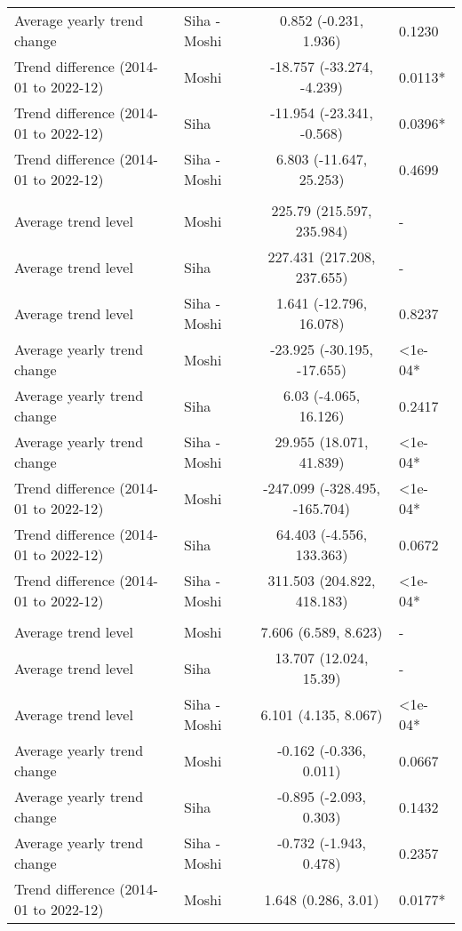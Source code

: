 \begin{longtable}{l|lcl}
Average yearly trend change & Siha - Moshi & 0.852 (-0.231, 1.936) & 0.1230 \\ 
Trend difference (2014-01 to 2022-12) & Moshi & -18.757 (-33.274, -4.239) & 0.0113* \\ 
Trend difference (2014-01 to 2022-12) & Siha & -11.954 (-23.341, -0.568) & 0.0396* \\ 
Trend difference (2014-01 to 2022-12) & Siha - Moshi & 6.803 (-11.647, 25.253) & 0.4699 \\ 
\midrule\addlinespace[2.5pt]
\multicolumn{4}{l}{Skin Infection - Fungal} \\ 
\midrule\addlinespace[2.5pt]
Average trend level & Moshi & 225.79 (215.597, 235.984) & - \\ 
Average trend level & Siha & 227.431 (217.208, 237.655) & - \\ 
Average trend level & Siha - Moshi & 1.641 (-12.796, 16.078) & 0.8237 \\ 
Average yearly trend change & Moshi & -23.925 (-30.195, -17.655) & <1e-04* \\ 
Average yearly trend change & Siha & 6.03 (-4.065, 16.126) & 0.2417 \\ 
Average yearly trend change & Siha - Moshi & 29.955 (18.071, 41.839) & <1e-04* \\ 
Trend difference (2014-01 to 2022-12) & Moshi & -247.099 (-328.495, -165.704) & <1e-04* \\ 
Trend difference (2014-01 to 2022-12) & Siha & 64.403 (-4.556, 133.363) & 0.0672 \\ 
Trend difference (2014-01 to 2022-12) & Siha - Moshi & 311.503 (204.822, 418.183) & <1e-04* \\ 
\midrule\addlinespace[2.5pt]
\multicolumn{4}{l}{Snake and Insect Bites} \\ 
\midrule\addlinespace[2.5pt]
Average trend level & Moshi & 7.606 (6.589, 8.623) & - \\ 
Average trend level & Siha & 13.707 (12.024, 15.39) & - \\ 
Average trend level & Siha - Moshi & 6.101 (4.135, 8.067) & <1e-04* \\ 
Average yearly trend change & Moshi & -0.162 (-0.336, 0.011) & 0.0667 \\ 
Average yearly trend change & Siha & -0.895 (-2.093, 0.303) & 0.1432 \\ 
Average yearly trend change & Siha - Moshi & -0.732 (-1.943, 0.478) & 0.2357 \\ 
Trend difference (2014-01 to 2022-12) & Moshi & 1.648 (0.286, 3.01) & 0.0177* \\ 

\end{longtable}

